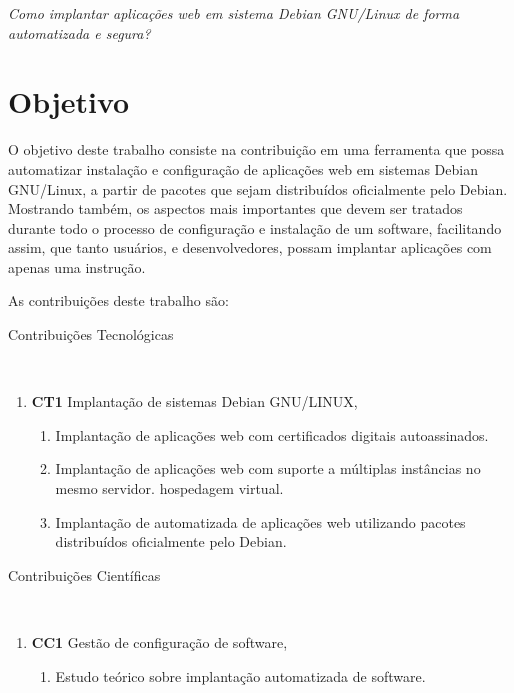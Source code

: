 \begin{center}
  \textit{
  Como implantar aplicações web em sistema Debian GNU/Linux de forma automatizada
  e segura?
}
\end{center}

\section{Objetivo}

O objetivo deste trabalho consiste na contribuição em uma ferramenta
que possa automatizar instalação e configuração de aplicações web em sistemas
Debian GNU/Linux, a partir de pacotes que sejam distribuídos oficialmente pelo
Debian. Mostrando também, os aspectos mais importantes que devem ser tratados durante
todo o processo de configuração e instalação de um software, facilitando assim, que
tanto usuários, e desenvolvedores, possam implantar aplicações com apenas uma
instrução.

As contribuições deste trabalho são:

\begin{description}
  \item [Contribuições Tecnológicas]\
\end{description}
    \begin{enumerate}
      \item \textbf{CT1} Implantação de sistemas Debian GNU/LINUX,
        \begin{enumerate}
          \item Implantação de aplicações web com certificados digitais autoassinados.
          \item Implantação de aplicações web com suporte a múltiplas instâncias no mesmo servidor.
          hospedagem virtual.
          \item Implantação de automatizada de aplicações web utilizando pacotes
          distribuídos oficialmente pelo Debian.
        \end{enumerate}
    \end{enumerate}

\begin{description}
  \item [Contribuições Científicas]\
\end{description}
    \begin{enumerate}
      \item \textbf{CC1} Gestão de configuração de software,
        \begin{enumerate}
          \item Estudo teórico sobre implantação automatizada de software.
        \end{enumerate}
    \end{enumerate}


